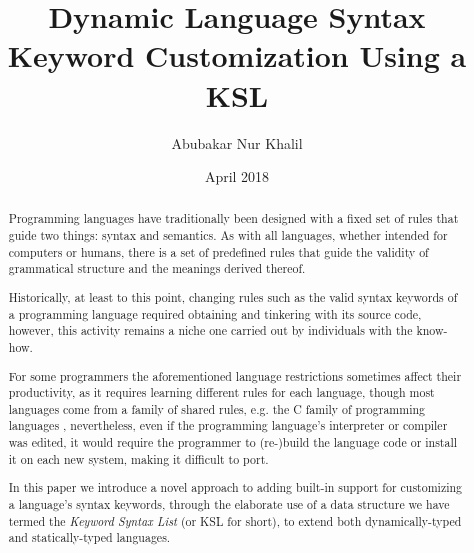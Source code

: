\documentclass{article}
\begin{document}
\title{Dynamic Language Syntax Keyword Customization Using a KSL}
\author{Abubakar Nur Khalil}
\date{April 2018}

\maketitle
\begin{abstract}
  Programming languages have traditionally been designed with a fixed set of rules that guide two things: syntax and semantics.
  As with all languages, whether intended for computers or humans, there is a set of predefined rules that guide the validity of grammatical structure and the meanings derived thereof.
  
  Historically, at least to this point, changing rules such as the valid syntax keywords of a programming language required obtaining and tinkering with its source code, however, this activity remains a niche one carried out by individuals with the know-how.
  
  For some programmers the aforementioned language restrictions sometimes affect their productivity, as it requires learning different rules for each language, though most languages come from a family of shared rules, e.g. the C family of programming languages \cite{Cfam}, nevertheless, even if the programming language's interpreter or compiler was edited, it would require the programmer to (re-)build the language code or install it on each new system, making it difficult to port.
  
  In this paper we introduce a novel approach to adding built-in support for customizing a language's syntax keywords, through the elaborate use of a data structure we have termed the \textit{Keyword Syntax List} (or KSL for short), to extend both dynamically-typed and statically-typed languages.
\end{abstract}

%
%
\end{document}
